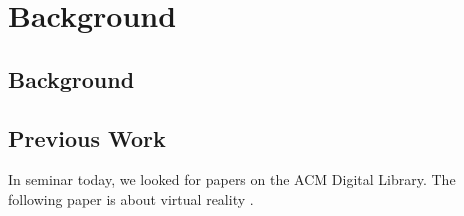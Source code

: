 \chapter{Background}
\label{chap:background}

\section{Background}

\section{Previous Work}

In seminar today, we looked for papers on the ACM Digital Library. The following paper is about virtual reality \cite{Kreylos:2006:ESW:1128923.1128948}.

